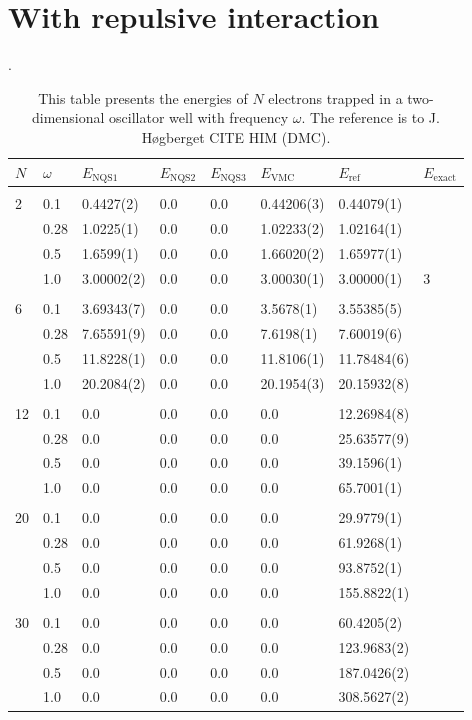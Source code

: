 \section{With repulsive interaction}
\begin{table} [H]
	\caption{This table presents the energies of $N$ electrons trapped in a two-dimensional oscillator well with frequency $\omega$. The reference is to J. Høgberget CITE HIM (DMC). }. 
	\begin{tabularx}{\textwidth}{l:l|XXXXXX} \hline\hline
		\label{tab:quantumdotswinteraction2D}
		$N$ & $\omega$ & $E_{\text{NQS1}}$ & $E_{\text{NQS2}}$ & $E_{\text{NQS3}}$ & $E_{\text{VMC}}$ & $E_{\text{ref}} $ & $E_{\text{exact}}$ \\ \hline \\
		2 & 0.1 & 0.4427(2) & 0.0 & 0.0 & 0.44206(3) & 0.44079(1) & \\ 
		& 0.28 & 1.0225(1) & 0.0 & 0.0 & 1.02233(2) & 1.02164(1) & \\
		& 0.5 & 1.6599(1) & 0.0 & 0.0 & 1.66020(2) & 1.65977(1)  \\
		& 1.0 & 3.00002(2) & 0.0 & 0.0 & 3.00030(1) & 3.00000(1) & 3  \\ \hdashline \\
		
		6 & 0.1 & 3.69343(7) & 0.0 & 0.0 & 3.5678(1) & 3.55385(5) \\ 
		& 0.28 & 7.65591(9) & 0.0 & 0.0 & 7.6198(1) & 7.60019(6) \\
		& 0.5 & 11.8228(1) & 0.0 & 0.0 & 11.8106(1) & 11.78484(6) \\
		& 1.0 & 20.2084(2) & 0.0 & 0.0 & 20.1954(3) & 20.15932(8) \\ \hdashline \\
		
		12 & 0.1 & 0.0 & 0.0 & 0.0 & 0.0 & 12.26984(8) \\ 
		& 0.28 & 0.0 & 0.0 & 0.0 & 0.0 & 25.63577(9) \\
		& 0.5 & 0.0 & 0.0 & 0.0 & 0.0 & 39.1596(1) \\
		& 1.0 & 0.0 & 0.0 & 0.0 & 0.0 & 65.7001(1) \\ \hdashline \\
		
		20 & 0.1 & 0.0 & 0.0 & 0.0 & 0.0 & 29.9779(1) \\ 
		& 0.28 & 0.0 & 0.0 & 0.0 & 0.0 & 61.9268(1) \\
		& 0.5 & 0.0 & 0.0 & 0.0 & 0.0 & 93.8752(1) \\
		& 1.0 & 0.0 & 0.0 & 0.0 & 0.0 & 155.8822(1) \\ \hdashline \\
		
		30 & 0.1 & 0.0 & 0.0 & 0.0 & 0.0 & 60.4205(2)\\ 
		& 0.28 & 0.0 & 0.0 & 0.0 & 0.0 & 123.9683(2)\\
		& 0.5 & 0.0 & 0.0 & 0.0 & 0.0 & 187.0426(2)\\
		& 1.0 & 0.0 & 0.0 & 0.0 & 0.0 & 308.5627(2)\\ \hline\hline
	\end{tabularx}
\end{table}

